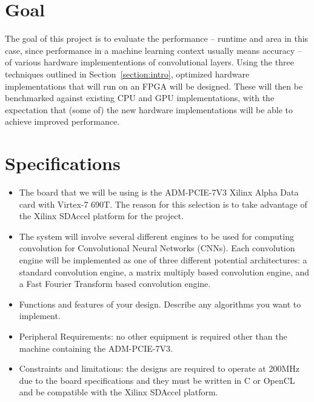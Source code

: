 \documentclass[conference,compsoc]{IEEEtran/IEEEtran}
\begin{document}
\section{Goal}\label{section:goal}

The goal of this project is to evaluate the performance -- runtime and area in this case, since performance in a machine learning context usually means accuracy -- of various hardware implemententions of convolutional layers.
Using the three techniques outlined in Section~\ref{section:intro}, optimized hardware implementations that will run on an FPGA will be designed.
These will then be benchmarked against existing CPU and GPU implementations, with the expectation that (some of) the new hardware implementations will be able to achieve improved performance.

\section{Specifications}\label{section:spec}
\begin{itemize}
\item The board that we will be using is the ADM-PCIE-7V3 Xilinx Alpha Data card
with Virtex-7 690T. The reason for this selection is to take advantage of the
Xilinx SDAccel platform for the project.

\item The system will involve several different engines to be used for computing
convolution for Convolutional Neural Networks (CNNs). Each convolution engine
will be implemented as one of three different potential architectures: a standard
convolution engine, a matrix multiply based convolution engine, and a Fast Fourier
Transform based convolution engine.

\item Functions and features of your design.
Describe any algorithms you want to implement.


\item Peripheral Requirements: no other equipment is required other than the machine
containing the ADM-PCIE-7V3.
\item Constraints and limitations: the designs are required to operate at 200MHz due
to the board specifications and they must be written in C or OpenCL and be compatible
with the Xilinx SDAccel platform.
\end{itemize}
\end{document}
